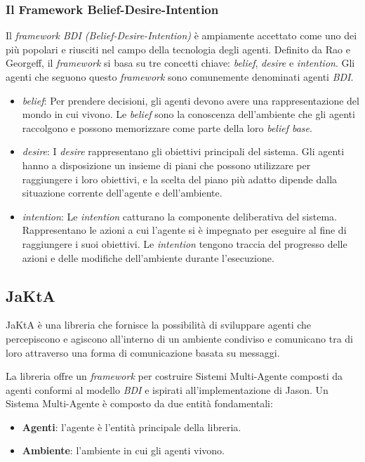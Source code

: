 \subsubsection{Il Framework Belief-Desire-Intention}
Il \textit{framework BDI (Belief-Desire-Intention)} è ampiamente accettato come uno dei più popolari e riusciti nel campo della tecnologia degli agenti. Definito da Rao e Georgeff, il \textit{framework} si basa su tre concetti chiave: \textit{belief}, \textit{desire} e \textit{intention}. Gli agenti che seguono questo \textit{framework} sono comunemente denominati agenti \textit{BDI}.

\begin{itemize}
    \item \textit{belief}: Per prendere decisioni, gli agenti devono avere una rappresentazione del mondo in cui vivono. Le \textit{belief} sono la conoscenza dell'ambiente che gli agenti raccolgono e possono memorizzare come parte della loro \textit{belief base}.
    \item \textit{desire}: I \textit{desire} rappresentano gli obiettivi principali del sistema. Gli agenti hanno a disposizione un insieme di piani che possono utilizzare per raggiungere i loro obiettivi, e la scelta del piano più adatto dipende dalla situazione corrente dell'agente e dell'ambiente.
    \item \textit{intention}: Le \textit{intention} catturano la componente deliberativa del sistema. Rappresentano le azioni a cui l'agente si è impegnato per eseguire al fine di raggiungere i suoi obiettivi. Le \textit{intention} tengono traccia del progresso delle azioni e delle modifiche dell'ambiente durante l'esecuzione.
\end{itemize}

\subsection{JaKtA}
JaKtA è una libreria che fornisce la possibilità di sviluppare agenti che percepiscono e agiscono all'interno di un ambiente condiviso e comunicano tra di loro attraverso una forma di comunicazione basata su messaggi.

La libreria offre un \textit{framework} per costruire Sistemi Multi-Agente composti da agenti conformi al modello \textit{BDI} e ispirati all'implementazione di Jason. Un Sistema Multi-Agente è composto da due entità fondamentali:

\begin{itemize}
    \item \textbf{Agenti}: l'agente è l'entità principale della libreria.
    \item \textbf{Ambiente}: l'ambiente in cui gli agenti vivono.
\end{itemize}

